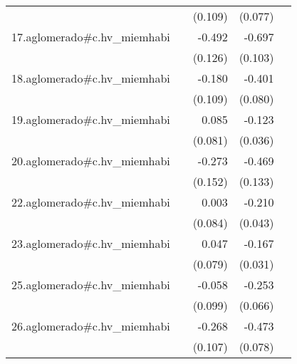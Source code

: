 {\begin{longtable}{l*{4}{D{.}{.}{-1}}}
            &                     &     (0.109)         &     (0.077)         &                     \\
\addlinespace
17.aglomerado#c.hv\_miemhabi&                     &      -0.492\sym{***}&      -0.697\sym{***}&                     \\
            &                     &     (0.126)         &     (0.103)         &                     \\
\addlinespace
18.aglomerado#c.hv\_miemhabi&                     &      -0.180         &      -0.401\sym{***}&                     \\
            &                     &     (0.109)         &     (0.080)         &                     \\
\addlinespace
19.aglomerado#c.hv\_miemhabi&                     &       0.085         &      -0.123\sym{***}&                     \\
            &                     &     (0.081)         &     (0.036)         &                     \\
\addlinespace
20.aglomerado#c.hv\_miemhabi&                     &      -0.273         &      -0.469\sym{***}&                     \\
            &                     &     (0.152)         &     (0.133)         &                     \\
\addlinespace
22.aglomerado#c.hv\_miemhabi&                     &       0.003         &      -0.210\sym{***}&                     \\
            &                     &     (0.084)         &     (0.043)         &                     \\
\addlinespace
23.aglomerado#c.hv\_miemhabi&                     &       0.047         &      -0.167\sym{***}&                     \\
            &                     &     (0.079)         &     (0.031)         &                     \\
\addlinespace
25.aglomerado#c.hv\_miemhabi&                     &      -0.058         &      -0.253\sym{***}&                     \\
            &                     &     (0.099)         &     (0.066)         &                     \\
\addlinespace
26.aglomerado#c.hv\_miemhabi&                     &      -0.268\sym{*}  &      -0.473\sym{***}&                     \\
            &                     &     (0.107)         &     (0.078)         &                     \\

\end{longtable}}
